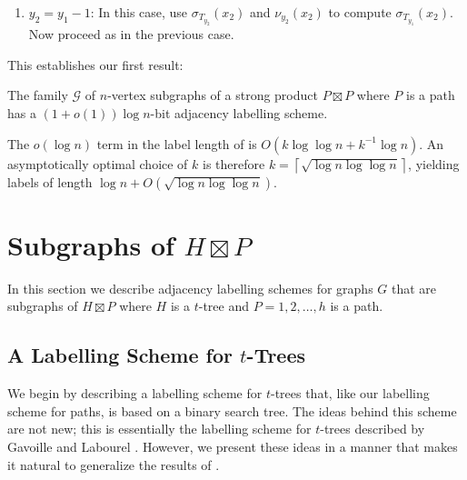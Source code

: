 \documentclass[kpfonts]{patmorin}
\begin{document}
\begin{enumerate}
  \item $y_2=y_1-1$: In this case, use $\sigma_{T_{y_2}}(x_2)$ and $\nu_{y_2}(x_2)$ to compute $\sigma_{T_{y_1}}(x_2)$.  Now proceed as in the previous case.
\end{enumerate}

This establishes our first result:

\begin{thm}
  The family $\mathcal{G}$ of $n$-vertex subgraphs of a strong product $P\boxtimes P$ where $P$ is a path has a $(1+o(1))\log n$-bit adjacency labelling scheme.
\end{thm}

\begin{rem}
  The $o(\log n)$ term in the label length of  is $O(k\log\log n + k^{-1}\log n)$.  An asymptotically optimal choice of $k$ is therefore $k=\left\lceil\sqrt{\log n\log\log n}\right\rceil$, yielding labels of length $\log n + O\left(\sqrt{\log n\log\log n}\right)$.
\end{rem}


\section{Subgraphs of $H\boxtimes P$}

In this section we describe adjacency labelling schemes for graphs $G$ that are subgraphs of $H\boxtimes P$ where $H$ is a $t$-tree and $P=1,2,\ldots,h$ is a path.  


\subsection{A Labelling Scheme for $t$-Trees}

We begin by describing a labelling scheme for $t$-trees that, like our labelling scheme for paths, is based on a binary search tree.  The ideas behind this scheme are not new; this is essentially the labelling scheme for $t$-trees described by Gavoille and Labourel \cite{gavoille.labourel:shorter}.  However, we present these ideas in a manner that makes it natural to generalize the results of .
\end{document}

